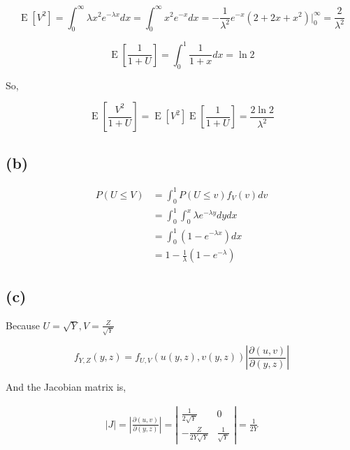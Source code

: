 \documentclass{article}
\begin{document}
\begin{equation}
    \operatorname{E}[V^2]  = \int_{0}^{\infty} \lambda x^2 e^{-\lambda x} dx = \int_{0}^{\infty} x^2 e^{- x} dx = -\frac{1}{\lambda^2} e^{-x} (2 + 2 x + x^2) \big|_{0}^{\infty} = \frac{2}{\lambda^2}
\end{equation}

\begin{equation}
    \operatorname{E}\left[\frac{1}{1+U}\right] = \int_{0}^{1} \frac {1}{1+x} dx = \ln 2
\end{equation}

So,

\begin{equation}
    \operatorname{E}\left[\frac{V^2}{1+U}\right]= \operatorname{E}[V^2] \operatorname{E}\left[\frac{1}{1+U}\right] = \frac{2\ln 2}{\lambda^2}
\end{equation}

\subsection{(b)}

\begin{equation}
    \begin{aligned}
        P(U\leqslant V) & = \int_{0}^1 P(U\leqslant v) f_V(v)dv \\
        & = \int_{0}^1 \int_{0}^x \lambda  e^{-\lambda y} dy dx \\
        & =  \int_{0}^1 (1-e^{-\lambda x})dx \\
        & = 1- \frac 1 {\lambda} (1-e^{-\lambda})
    \end{aligned}
\end{equation}

\subsection{(c)}

Because $U =\sqrt{Y}, V = \frac{Z}{\sqrt{Y}}$ 

\begin{equation}
    f_{Y,Z}(y, z)=f_{U,V}(u(y,z), v(y,z))\left|\frac{\partial(u,v)}{\partial(y,z)}\right|
\end{equation}

And the Jacobian matrix is,

\begin{equation}
    \begin{aligned}
        \left|J\right| = \left|\frac{\partial(u,v)}{\partial(y,z)}\right| = \left|\begin{matrix}
            \frac{1}{2\sqrt{Y}}&0\\-\frac{Z}{2Y\sqrt{Y}}&\frac{1}{\sqrt{Y}} 
        \end{matrix}\right| = \frac{1}{2Y}
    \end{aligned}
\end{equation}
\end{document}
